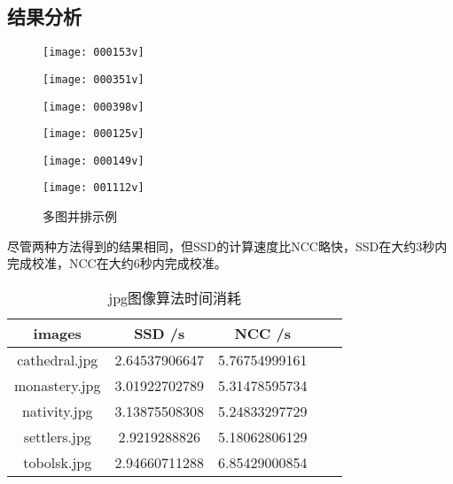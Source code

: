 \documentclass[withoutpreface,bwprint]{cumcmthesis} %
\begin{document}
\subsection{结果分析}
\begin{figure}[H]
    \centering
    \begin{minipage}[c]{0.3\textwidth}
        \centering
        \texttt{[image: 000153v]}
        \label{fig:sample-figure-a}
    \end{minipage}
    \begin{minipage}[c]{0.3\textwidth}
        \centering
        \texttt{[image: 000351v]}
        \label{fig:sample-figure-b}
    \end{minipage}
    \begin{minipage}[c]{0.3\textwidth}
        \centering
        \texttt{[image: 000398v]}
        \label{fig:sample-figure-c}
    \end{minipage}

    \begin{minipage}[c]{0.3\textwidth}
        \centering
        \texttt{[image: 000125v]}

        \label{fig:sample-figure-a}
    \end{minipage}
    \begin{minipage}[c]{0.3\textwidth}
        \centering
        \texttt{[image: 000149v]}
  
        \label{fig:sample-figure-b}
    \end{minipage}
    \begin{minipage}[c]{0.3\textwidth}
        \centering
        \texttt{[image: 001112v]}

        \label{fig:sample-figure-c}
    \end{minipage}
    \caption{多图并排示例}
    \label{fig:sample-figure}
\end{figure}


尽管两种方法得到的结果相同，但SSD的计算速度比NCC略快，SSD在大约3秒内完成校准，NCC在大约6秒内完成校准。
\begin{table}[!htbp]
    \caption{jpg图像算法时间消耗}\label{tab:002} \centering
    \begin{tabular}{ccccc}
        \toprule[1.5pt]
        images & SSD /s   & NCC /s\\
        \midrule[1pt]
        cathedral.jpg& 2.64537906647  &	5.76754999161\\
        monastery.jpg& 3.01922702789& 	5.31478595734 \\
        nativity.jpg& 3.13875508308 &	5.24833297729 \\
        settlers.jpg& 2.9219288826 &	5.18062806129 \\
        tobolsk.jpg& 2.94660711288 &	6.85429000854 \\
        \bottomrule[1.5pt]
    \end{tabular}
\end{table}
\end{document}
